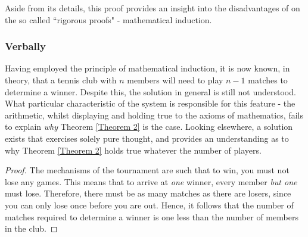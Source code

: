 \documentclass{article}
\begin{document}
Aside from its details, this proof provides an insight into the disadvantages of on the so called ``rigorous proofs" - mathematical induction.

\subsubsection{Verbally}
Having employed the principle of mathematical induction, it is now known, in theory, that a tennis club with $n$ members will need to play $n-1$ matches to determine a winner. Despite this, the solution in general is still not understood. What particular characteristic of the system is responsible for this feature - the arithmetic, whilst displaying and holding true to the axioms of mathematics, fails to explain \textit{why} Theorem \ref{Theorem 2} is the case. Looking elsewhere, a solution exists that exercises solely pure thought, and provides an understanding as to why Theorem \ref{Theorem 2} holds true whatever the number of players.

\begin{proof}
    The mechanisms of the tournament are such that to win, you must not lose any games. This means that to arrive at \textit{one} winner, every member \textit{but one} must lose. Therefore, there must be as many matches as there are losers, since you can only lose once before you are out. Hence, it follows that the number of matches required to determine a winner is one less than the number of members in the club.
\end{proof}
\end{document}
